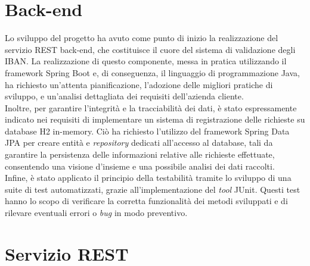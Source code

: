 \section{Back-end}

Lo sviluppo del progetto ha avuto come punto di inizio la realizzazione del servizio REST back-end, che costituisce il cuore del sistema di validazione degli IBAN. La realizzazione di questo componente, messa in pratica utilizzando il framework Spring Boot e, di conseguenza, il linguaggio di programmazione Java, ha richiesto un'attenta pianificazione, l'adozione delle migliori pratiche di sviluppo, e un'analisi dettagliata dei requisiti dell'azienda cliente.\\
Inoltre, per garantire l’integrità e la tracciabilità dei dati, è stato espressamente indicato nei requisiti di implementare un sistema di registrazione delle richieste su database H2 in-memory. Ciò ha richiesto l'utilizzo del framework Spring Data JPA per creare entità e \textit{repository} dedicati all'accesso al database, tali da garantire la persistenza delle informazioni relative alle richieste effettuate, consentendo una visione d'insieme e una possibile analisi dei dati raccolti.\\
Infine, è stato applicato il principio della testabilità tramite lo sviluppo di una suite di test automatizzati, grazie all’implementazione del \textit{tool} JUnit. Questi test hanno lo scopo di verificare la corretta funzionalità dei metodi sviluppati e di rilevare eventuali errori o \textit{bug} in modo preventivo.

\section{Servizio REST}

